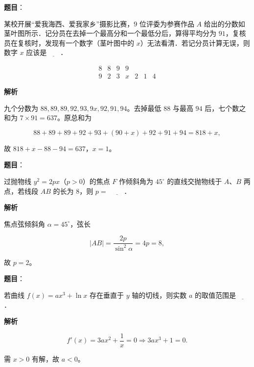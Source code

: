 \begin{answer}

\textbf{题目}：

某校开展“爱我海西、爱我家乡”摄影比赛，$9$ 位评委为参赛作品 $A$ 给出的分数如茎叶图所示．记分员在去掉一个最高分和一个最低分后，算得平均分为 $91$，复核员在复核时，发现有一个数字（茎叶图中的 $x$）无法看清．若记分员计算无误，则数字 $x$ 应该是$\underline{\qquad}$．

\nopagebreak[4]
\[\begin{array}{c|cccccc}
8&8&9&9&&&\\
9&2&3&x&2&1&4
\end{array}\]

\textbf{解析}

九个分数为 $88,89,89,92,93,9x,92,91,94$。去掉最低 $88$ 与最高 $94$ 后，七个数之和为 $7\times91=637$。原总和为

\nopagebreak[4]
\[88+89+89+92+93+(90+x)+92+91+94=818+x,\]

故 $818+x-88-94=637$，$x=1$。


\end{answer}
\begin{answer}

\textbf{题目}：

过抛物线 $y^2=2px$（$p>0$）的焦点 $F$ 作倾斜角为 $45^\circ$ 的直线交抛物线于 $A$、$B$ 两点，若线段 $AB$ 的长为 $8$，则 $p=$ $\underline{\qquad}$．

\textbf{解析}

焦点弦倾斜角 $\alpha=45^\circ$，弦长

\nopagebreak[4]
\[|AB|=\frac{2p}{\sin^2\alpha}=4p=8,\]

故 $p=2$。


\end{answer}
\begin{answer}

\textbf{题目}：

若曲线 $f(x)=ax^3+\ln x$ 存在垂直于 $y$ 轴的切线，则实数 $a$ 的取值范围是$\underline{\qquad}$．

\textbf{解析}

\nopagebreak[4]
\[f'(x)=3ax^2+\frac1x=0
\Longrightarrow 3ax^3+1=0.\]

需 $x>0$ 有解，故 $a<0$。


\end{answer}
